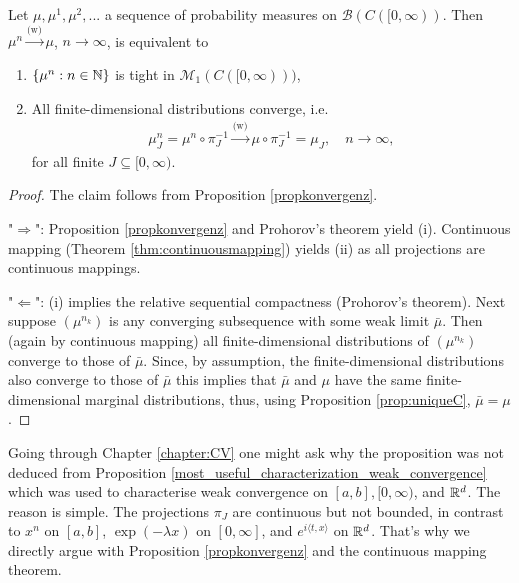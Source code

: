 \begin{laussagewerkzeug}
	\begin{prop}\label{most_useful_characterization_weak_convergence_C}
		Let $\mu,\mu^1, \mu^2, ...$ a sequence of probability measures on $\mathcal B(C([0,\infty))$. Then $\mu^n\overset{\text{(w)}}{\rightarrow} \mu$, $n\to\infty$, is equivalent to
		\begin{enumerate}[label=(\roman*)]
				\item $\{\mu^n:n\in\mathbb{N}\}$ is tight in $\mathcal M_1(C([0,\infty)))$,
				\item All finite-dimensional distributions converge, i.e. 
				\begin{align*}
					\mu^n_J=\mu^n \circ \pi^{-1}_J\overset{\text{(w)}}{\longrightarrow} \mu \circ \pi^{-1}_J=\mu_J,\quad n\to\infty,
				\end{align*}
				for all finite $J\subseteq [0,\infty)$.
			\end{enumerate}
	\end{prop}
	\end{laussagewerkzeug}
\begin{proof}[Proof]
	The claim follows from Proposition \ref{propkonvergenz}.\smallskip
	
	"$\Rightarrow$": Proposition \ref{propkonvergenz} and Prohorov's theorem yield (i). Continuous mapping (Theorem \ref{thm:continuousmapping}) yields (ii) as all projections are continuous mappings.\smallskip

	"$\Leftarrow$": (i) implies the relative sequential compactness (Prohorov's theorem). Next suppose $(\mu^{n_k})$ is any converging subsequence with some weak limit $\bar \mu$. Then (again by continuous mapping) all finite-dimensional distributions of $(\mu^{n_k})$ converge to those of $\bar \mu$. Since, by assumption, the finite-dimensional distributions also converge to those of $\bar\mu$ this implies that $\bar \mu$ and $\mu$ have the same finite-dimensional marginal distributions, thus, using Proposition \ref{prop:uniqueC}, $\bar \mu=\mu$.
\end{proof}	
Going through Chapter \ref{chapter:CV} one might ask why the proposition was not deduced from Proposition \ref{most_useful_characterization_weak_convergence} which was used to characterise weak convergence on $[a,b], [0,\infty)$, and $\mathbb{R}^d$. The reason is simple. The projections $\pi_J$ are continuous but not bounded, in contrast to $x^n$ on $[a,b]$, $\exp(-\lambda x)$ on $[0,\infty]$, and $e^{i\langle t,x\rangle}$ on $\mathbb{R}^d$. That's why we directly argue with Proposition \ref{propkonvergenz} and the continuous mapping theorem.\smallskip

